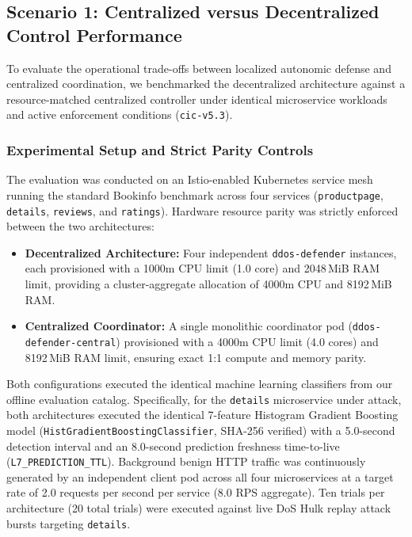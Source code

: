 
\subsection{Scenario 1: Centralized versus Decentralized Control Performance}
\label{sec:eval_scenario1_performance}

To evaluate the operational trade-offs between localized autonomic defense and centralized coordination, we benchmarked the decentralized architecture against a resource-matched centralized controller under identical microservice workloads and active enforcement conditions (\texttt{cic-v5.3}). 

\subsubsection{Experimental Setup and Strict Parity Controls}
The evaluation was conducted on an Istio-enabled Kubernetes service mesh running the standard Bookinfo benchmark across four services (\texttt{productpage}, \texttt{details}, \texttt{reviews}, and \texttt{ratings}). Hardware resource parity was strictly enforced between the two architectures:
\begin{itemize}
    \item \textbf{Decentralized Architecture:} Four independent \texttt{ddos-defender} instances, each provisioned with a 1000m CPU limit (1.0 core) and 2048\,MiB RAM limit, providing a cluster-aggregate allocation of 4000m CPU and 8192\,MiB RAM.
    \item \textbf{Centralized Coordinator:} A single monolithic coordinator pod (\texttt{ddos-defender-central}) provisioned with a 4000m CPU limit (4.0 cores) and 8192\,MiB RAM limit, ensuring exact 1:1 compute and memory parity.
\end{itemize}

Both configurations executed the identical machine learning classifiers from our offline evaluation catalog. Specifically, for the \texttt{details} microservice under attack, both architectures executed the identical 7-feature Histogram Gradient Boosting model (\texttt{HistGradientBoostingClassifier}, SHA-256 verified) with a 5.0-second detection interval and an 8.0-second prediction freshness time-to-live (\texttt{L7\_PREDICTION\_TTL}). Background benign HTTP traffic was continuously generated by an independent client pod across all four microservices at a target rate of 2.0 requests per second per service (8.0 RPS aggregate). Ten trials per architecture (20 total trials) were executed against live DoS Hulk replay attack bursts targeting \texttt{details}.

